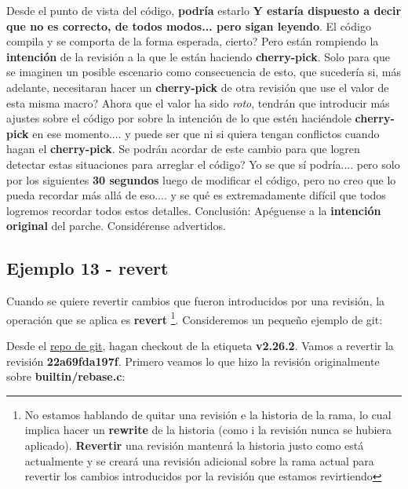 Desde el punto de vista del código, {\bf podría} estarlo {\bf Y estaría dispuesto a decir que no es correcto, de todos modos... pero
sigan leyendo}. El código compila y se comporta de la forma esperada, cierto? Pero están rompiendo la {\bf intención} de la revisión
a la que le están haciendo {\bf cherry-pick}. Solo para que se imaginen un posible escenario como consecuencia de esto, que sucedería
si, más adelante, necesitaran hacer un {\bf cherry-pick} de otra revisión que use el valor de esta misma macro? Ahora que el valor ha sido
{\it roto}, tendrán que introducir más ajustes sobre el código por sobre la intención de lo que estén haciéndole {\bf cherry-pick}
en ese momento.... y puede ser que ni si quiera tengan conflictos cuando hagan el {\bf cherry-pick}. Se podrán acordar de este cambio
para que logren detectar estas situaciones para arreglar el código? Yo se que sí podría.... pero solo por los siguientes
{\bf 30 segundos} luego de modificar el código, pero no creo que lo pueda recordar más allá de eso.... y se qué es extremadamente
difícil que todos logremos recordar todos estos detalles. Conclusión: Apéguense a la {\bf intención original} del parche.
Considérense advertidos.

\subsection{Ejemplo 13 - revert}

Cuando se quiere revertir cambios que fueron introducidos por una revisión, la operación que se aplica es {\bf revert}
\footnote{No estamos hablando de quitar una revisión e la historia de la rama, lo cual implica hacer un {\bf rewrite} de
la historia (como i la revisión nunca se hubiera aplicado). {\bf Revertir} una revisión mantenrá la historia justo como
está actualmente y se creará una revisión adicional sobre la rama actual para revertir los cambios introducidos por la
revisión que estamos revirtiendo}. Consideremos un pequeño ejemplo de git:

Desde el \hyperref[git_repo]{repo de git}, hagan checkout de la etiqueta {\bf v2.26.2}. Vamos a revertir la revisión {\bf 22a69fda197f}.
Primero veamos lo que hizo la revisión originalmente sobre {\bf builtin/rebase.c}:

